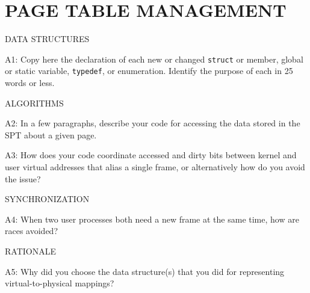 \section*{PAGE TABLE MANAGEMENT}

\begin{aspect}{DATA STRUCTURES}
	\begin{qc}
		A1: Copy here the declaration of each new or changed \lstinline{struct} or member,
		global or static variable, \lstinline{typedef}, or enumeration.
		Identify the purpose of each in 25 words or less.
	\end{qc}

\end{aspect}

\begin{aspect}{ALGORITHMS}

	\begin{qc}
		A2: In a few paragraphs, describe your code for accessing the data stored in the SPT about a given page.
	\end{qc}

	\begin{qc}
		A3: How does your code coordinate accessed and dirty bits between kernel and user virtual addresses
		that alias a single frame,
		or alternatively how do you avoid the issue?
	\end{qc}
\end{aspect}

\begin{aspect}{SYNCHRONIZATION}
	\begin{qc}
		A4: When two user processes both need a new frame at the same time,
		how are races avoided?
	\end{qc}
\end{aspect}

\begin{aspect}{RATIONALE}
	\begin{qc}
		A5: Why did you choose the data structure(s) that you did
		for representing virtual-to-physical mappings?
	\end{qc}
\end{aspect}
